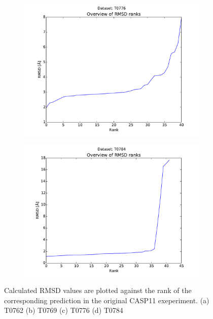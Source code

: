 \documentclass[11pt,a4paper]{article}
\renewcommand{\(}{\left (}
\renewcommand{\)}{\right )}
\begin{document}
\begin{figure}[!h]
	\vspace*{3mm}
	\begin{subfigure}{.5\textwidth}
		\includegraphics[width=\textwidth]{../results/rank_T0776}
		\subcaption{}
	\end{subfigure}
	\begin{subfigure}{.5\textwidth}
		\includegraphics[width=\textwidth]{../results/rank_T0784}
		\subcaption{}
	\end{subfigure}
	\caption{Calculated RMSD values are plotted against the rank of the corresponding prediction in the original CASP11 exeperiment. (a) T0762 (b) T0769 (c) T0776 (d) T0784}
	\label{ranks}
\end{figure}
\end{document}
